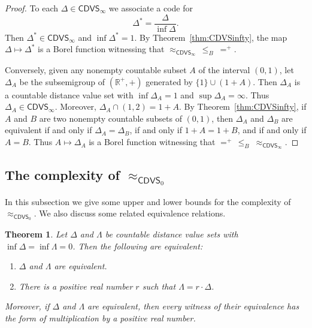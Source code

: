 \documentclass{amsart}
\newtheorem{theorem}{Theorem}[section]
\theoremstyle{definition}
\theoremstyle{remark}
\begin{document}
\begin{proof}
To each $\Delta\in \mathsf{CDVS}_\infty$ we associate a code for 
$$ \Delta^*=\displaystyle\frac{\Delta}{\inf\Delta}. $$
Then $\Delta^*\in \mathsf{CDVS}_\infty$ and $\inf\Delta^*=1$. By Theorem~\ref{thm:CDVSinfty}, the map $\Delta\mapsto \Delta^*$ is a Borel function witnessing that $\approx_{\mathsf{CDVS}_\infty}\,\leq_B\ =^+$.

Conversely, given any nonempty countable subset $A$ of the interval $(0,1)$, let $\Delta_A$ be the subsemigroup of $(\mathbb{R}^+,+)$ generated by $\{1\}\cup (1+A)$. Then $\Delta_A$ is a countable distance value set with $\inf \Delta_A= 1$ and $\sup\Delta_A=\infty$.  Thus $\Delta_A\in \mathsf{CDVS}_\infty$. Moreover, $\Delta_A\cap (1,2)=1+A$. By Theorem~\ref{thm:CDVSinfty}, if $A$ and $B$ are two nonempty countable subsets of $(0,1)$, then $\Delta_A$ and $\Delta_B$ are equivalent if and only if $\Delta_A=\Delta_B$, if and only if $1+A=1+B$, and if and only if $A=B$. Thus $A\mapsto \Delta_A$ is a Borel function witnessing that $=^+\,\leq_B\ \approx_{\mathsf{CDVS}_\infty}$.
\end{proof}











\subsection{The complexity of $\approx_{\mathsf{CDVS}_0}$\label{sec:4}} 



In this subsection we give some upper and lower bounds for the complexity of $\approx_{\mathsf{CDVS}_0}$. We also discuss some related equivalence relations. 

 \begin{theorem}\label{thm:simapprox}
        Let $\Delta$ and $\Lambda$ be countable distance value sets with $\inf\Delta=\inf\Lambda=0$. Then the following are equivalent: 
        \begin{enumerate}
            \item[\rm (1)] $\Delta$ and $\Lambda$ are equivalent. 
            \item[\rm (2)] There is a positive real number $r$ such that $\Lambda = r \cdot \Delta$. 
        \end{enumerate} 

        Moreover, if $\Delta$ and $\Lambda$ are equivalent, then every witness of their equivalence has the form of multiplication by a positive real number. 
     \end{theorem}
     
\end{document}
